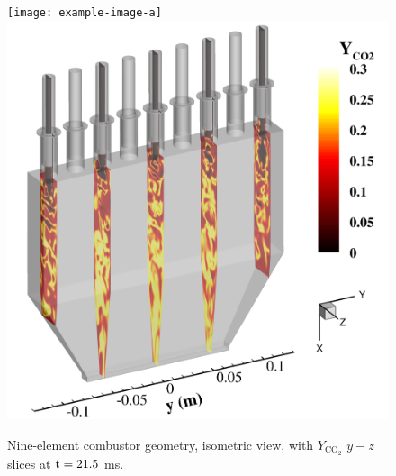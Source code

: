 \begin{figure}
    \centering
	\ifdefined\DRAFT
		\texttt{[image: example-image-a]}
	\else
    	\includegraphics[width=0.9\linewidth]{Chapters/NineElement/Images/geom_iso.png}
	\fi
    \caption{\label{fig:nineElemGeomIso}Nine-element combustor geometry, isometric view, with $Y_{\text{CO}_2}$ $y-z$ slices at $\text{t} = 21.5$ ms.}
\end{figure}